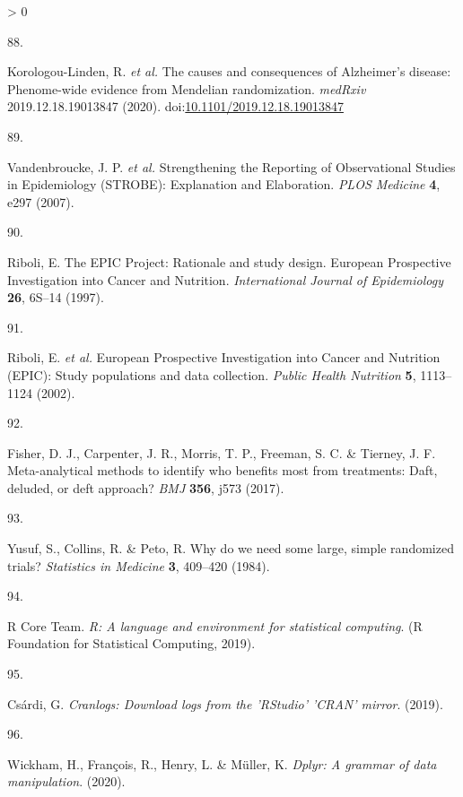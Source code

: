 \documentclass[a4paper, twoside]{templates/ociamthesis}
\newlength{\cslhangindent}
\newlength{\csllabelwidth}
\newenvironment{CSLReferences}[3] %
 {%
  \setlength{\parindent}{0pt}
  \ifodd #1 \everypar{\setlength{\hangindent}{\cslhangindent}}\ignorespaces\fi
  \ifnum #2 > 0
  \setlength{\parskip}{#2\baselineskip}
  \fi
 }%
 {}
\newcommand{\CSLLeftMargin}[1]{\parbox[t]{\maxof{\widthof{#1}}{\csllabelwidth}}{#1}}
\newcommand{\CSLRightInline}[1]{\parbox[t]{\linewidth - \csllabelwidth}{#1}}
\begin{document}
\begin{CSLReferences}{0}{0}
\leavevmode\hypertarget{ref-korologou-linden2020}{}%
\CSLLeftMargin{88. }
\CSLRightInline{Korologou-Linden, R. \emph{et al.} The causes and consequences of {Alzheimer}'s disease: Phenome-wide evidence from {Mendelian} randomization. \emph{medRxiv} 2019.12.18.19013847 (2020). doi:\href{https://doi.org/10.1101/2019.12.18.19013847}{10.1101/2019.12.18.19013847}}

\leavevmode\hypertarget{ref-vandenbroucke2007}{}%
\CSLLeftMargin{89. }
\CSLRightInline{Vandenbroucke, J. P. \emph{et al.} Strengthening the {Reporting} of {Observational Studies} in {Epidemiology} ({STROBE}): {Explanation} and {Elaboration}. \emph{PLOS Medicine} \textbf{4}, e297 (2007).}

\leavevmode\hypertarget{ref-riboli1997}{}%
\CSLLeftMargin{90. }
\CSLRightInline{Riboli, E. The {EPIC Project}: Rationale and study design. {European Prospective Investigation} into {Cancer} and {Nutrition}. \emph{International Journal of Epidemiology} \textbf{26}, 6S--14 (1997).}

\leavevmode\hypertarget{ref-riboli2002}{}%
\CSLLeftMargin{91. }
\CSLRightInline{Riboli, E. \emph{et al.} European {Prospective Investigation} into {Cancer} and {Nutrition} ({EPIC}): Study populations and data collection. \emph{Public Health Nutrition} \textbf{5}, 1113--1124 (2002).}

\leavevmode\hypertarget{ref-fisher2017}{}%
\CSLLeftMargin{92. }
\CSLRightInline{Fisher, D. J., Carpenter, J. R., Morris, T. P., Freeman, S. C. \& Tierney, J. F. Meta-analytical methods to identify who benefits most from treatments: Daft, deluded, or deft approach? \emph{BMJ} \textbf{356}, j573 (2017).}

\leavevmode\hypertarget{ref-yusuf1984}{}%
\CSLLeftMargin{93. }
\CSLRightInline{Yusuf, S., Collins, R. \& Peto, R. Why do we need some large, simple randomized trials? \emph{Statistics in Medicine} \textbf{3}, 409--420 (1984).}

\leavevmode\hypertarget{ref-base}{}%
\CSLLeftMargin{94. }
\CSLRightInline{R Core Team. \emph{R: {A} language and environment for statistical computing}. ({R Foundation for Statistical Computing}, 2019).}

\leavevmode\hypertarget{ref-cranlogs}{}%
\CSLLeftMargin{95. }
\CSLRightInline{Csárdi, G. \emph{Cranlogs: {Download} logs from the '{RStudio}' '{CRAN}' mirror}. (2019).}

\leavevmode\hypertarget{ref-dplyr}{}%
\CSLLeftMargin{96. }
\CSLRightInline{Wickham, H., François, R., Henry, L. \& Müller, K. \emph{Dplyr: {A} grammar of data manipulation}. (2020).}


\end{CSLReferences}
\end{document}
